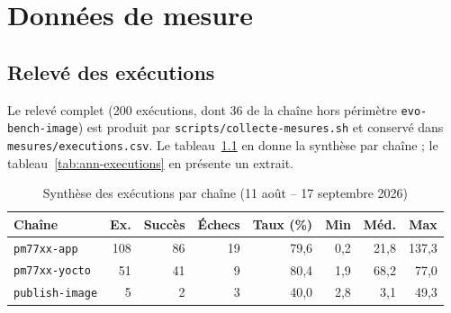 \chapter{Données de mesure}
\label{ann:donnees}

\section{Relevé des exécutions}
\label{ann:releve-executions}

Le relevé complet (200 exécutions, dont 36 de la chaîne hors périmètre
\texttt{evo-bench-image}) est produit par \texttt{scripts/collecte-mesures.sh}
et conservé dans \texttt{mesures/executions.csv}. Le
tableau~\ref{tab:ann-synthese} en donne la synthèse par chaîne ; le
tableau~\ref{tab:ann-executions} en présente un extrait.

\begin{table}[H]
\centering
\caption{Synthèse des exécutions par chaîne (11 août -- 17 septembre 2026)}
\label{tab:ann-synthese}
\small
\begin{tabular}{@{}lrrrrrrr@{}}
\toprule
\textbf{Chaîne} & \textbf{Ex.} & \textbf{Succès} & \textbf{Échecs} & \textbf{Taux (\%)} &
\textbf{Min} & \textbf{Méd.} & \textbf{Max} \\
\midrule
\texttt{pm77xx-app} & 108 & 86 & 19 & 79,6 & 0,2 & 21,8 & 137,3 \\
\texttt{pm77xx-yocto} & 51 & 41 & 9 & 80,4 & 1,9 & 68,2 & 77,0 \\
\texttt{publish-image} & 5 & 2 & 3 & 40,0 & 2,8 & 3,1 & 49,3 \\
\bottomrule
\end{tabular}
\end{table}

